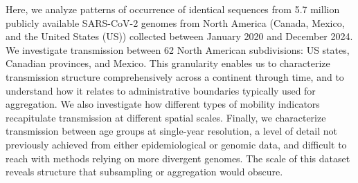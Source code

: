 \documentclass[11pt, letterpaper, oneside]{article}
\begin{document}
Here, we analyze patterns of occurrence of identical sequences from 5.7 million publicly available SARS-CoV-2 genomes from North America (Canada, Mexico, and the United States (US)) collected between January 2020 and December 2024.
We investigate transmission between 62 North American subdivisions: US states, Canadian provinces, and Mexico.
This granularity enables us to characterize transmission structure comprehensively across a continent through time, and to understand how it relates to administrative boundaries typically used for aggregation.
We also investigate how different types of mobility indicators recapitulate transmission at different spatial scales.
Finally, we characterize transmission between age groups at single-year resolution, a level of detail not previously achieved from either epidemiological or genomic data, and difficult to reach with methods relying on more divergent genomes.\autocite{tran-kiemCharacterizingInformativenessPathogen2026}
The scale of this dataset reveals structure that subsampling or aggregation would obscure.

\end{document}
